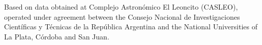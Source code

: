 \documentclass[baaa]{baaa}
\begin{document}
\begin{acknowledgement}
Based on data obtained at Complejo Astron\'omico El Leoncito (CASLEO), operated under agreement between the Consejo Nacional de Investigaciones Cient\'ificas y T\'ecnicas de la Rep\'ublica Argentina and the National Universities of La Plata, C\'ordoba and San Juan.
\end{acknowledgement}



\small

 
\end{document}
